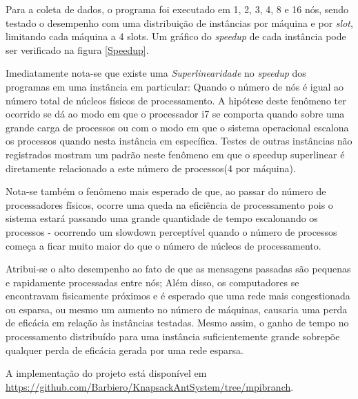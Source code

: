 Para a coleta de dados, o programa foi executado em 1, 2, 3, 4, 8 e 16 nós, sendo testado o desempenho com uma distribuição de instâncias por máquina e por \textit{slot}, limitando cada máquina a 4 slots. Um gráfico do \textit{speedup} de cada instância pode ser verificado na figura \ref{Speedup}.



Imediatamente nota-se que existe uma \textit{Superlinearidade} no \textit{speedup} dos programas em uma instância em particular: Quando o número de nós é igual ao número total de núcleos físicos de processamento. A hipótese deste fenômeno ter ocorrido se dá ao modo em que o processador i7 se comporta quando sobre uma grande carga de processos ou com o modo em que o sistema operacional escalona os processos quando nesta instância em específica. Testes de outras instâncias não registrados mostram um padrão neste fenômeno em que o speedup superlinear é diretamente relacionado a este número de processos(4 por máquina).

Nota-se também o fenômeno mais esperado de que, ao passar do número de processadores físicos, ocorre uma queda na eficiência de processamento pois o sistema estará passando uma grande quantidade de tempo escalonando os processos - ocorrendo um slowdown perceptível quando o número de processos começa a ficar muito maior do que o número de núcleos de processamento.

Atribui-se o alto desempenho ao fato de que as mensagens passadas são pequenas e rapidamente processadas entre nós; Além disso, os computadores se encontravam fisicamente próximos e é esperado que uma rede mais congestionada ou esparsa, ou mesmo um aumento no número de máquinas, causaria uma perda de eficácia em relação às instâncias testadas. Mesmo assim, o ganho de tempo no processamento distribuído para uma instância suficientemente grande sobrepõe qualquer perda de eficácia gerada por uma rede esparsa.


A implementação do projeto está disponível em \url{https://github.com/Barbiero/KnapsackAntSystem/tree/mpibranch}.